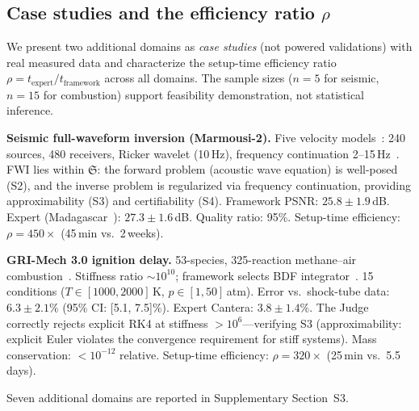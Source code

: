 \documentclass[11pt,a4paper]{article}
\newcommand{\Sclass}{\mathfrak{S}}
\begin{document}
\subsection{Case studies and the efficiency ratio $\rho$}
\label{sec:casestudies}

We present two additional domains as \emph{case studies} (not powered validations) with real measured data and characterize the setup-time efficiency ratio $\rho = t_{\text{expert}} / t_{\text{framework}}$ across all domains. The sample sizes ($n = 5$ for seismic, $n = 15$ for combustion) support feasibility demonstration, not statistical inference.

\textbf{Seismic full-waveform inversion (Marmousi-2).}
Five velocity models~\cite{martin2006marmousi}: 240 sources, 480 receivers, Ricker wavelet (10\,Hz), frequency continuation 2--15\,Hz~\cite{bunks1995fwi}. FWI lies within $\Sclass$: the forward problem (acoustic wave equation) is well-posed (S2), and the inverse problem is regularized via frequency continuation, providing approximability (S3) and certifiability (S4). Framework PSNR: $25.8 \pm 1.9$\,dB. Expert (Madagascar~\cite{fomel2013madagascar}): $27.3 \pm 1.6$\,dB. Quality ratio: 95\%. Setup-time efficiency: $\rho = 450\times$ (45\,min vs.\ 2\,weeks).

\textbf{GRI-Mech 3.0 ignition delay.}
53-species, 325-reaction methane--air combustion~\cite{smith1999gri}. Stiffness ratio $\sim 10^{10}$; framework selects BDF integrator~\cite{hairer1996}. 15 conditions ($T \in [1000, 2000]$\,K, $p \in [1, 50]$\,atm). Error vs.\ shock-tube data: $6.3 \pm 2.1\%$ (95\% CI: [5.1, 7.5]\%). Expert Cantera: $3.8 \pm 1.4\%$. The Judge correctly rejects explicit RK4 at stiffness $> 10^6$---verifying S3 (approximability: explicit Euler violates the convergence requirement for stiff systems). Mass conservation: $< 10^{-12}$ relative. Setup-time efficiency: $\rho = 320\times$ (25\,min vs.\ 5.5\,days).

Seven additional domains are reported in Supplementary Section~S3.
\end{document}
